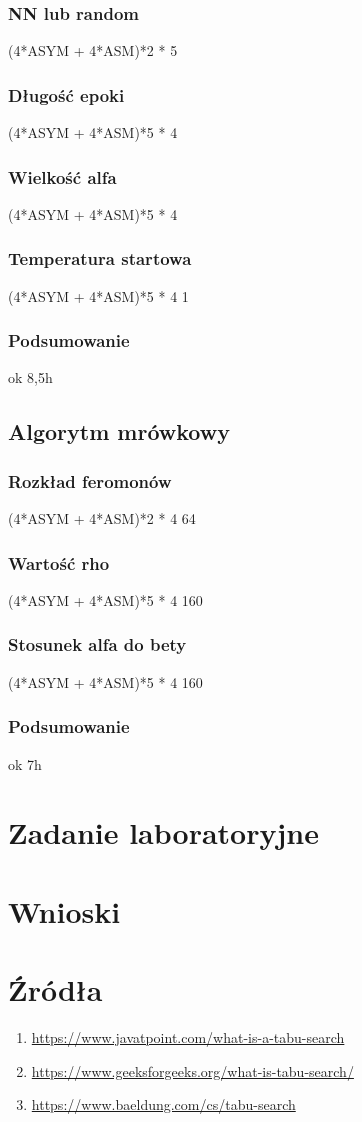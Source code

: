\documentclass{article}
\begin{document}
      \subsubsection{NN lub random}
        (4*ASYM + 4*ASM)*2 * 5 
      \subsubsection{Długość epoki}
        (4*ASYM + 4*ASM)*5 * 4 
      \subsubsection{Wielkość alfa}
        (4*ASYM + 4*ASM)*5 * 4 
      \subsubsection{Temperatura startowa}
        (4*ASYM + 4*ASM)*5 * 4 1
      \subsubsection{Podsumowanie}ok 8,5h
    \subsection{Algorytm mrówkowy}
      \subsubsection{Rozkład feromonów}
        (4*ASYM + 4*ASM)*2 * 4 64
      \subsubsection{Wartość rho}
        (4*ASYM + 4*ASM)*5 * 4 160
      \subsubsection{Stosunek alfa do bety}
        (4*ASYM + 4*ASM)*5 * 4 160
      \subsubsection{Podsumowanie}ok 7h
    \section{Zadanie laboratoryjne}


    \section{Wnioski}


    \section{Źródła}
      \begin{enumerate}[label=\arabic*.]
        \item \url{https://www.javatpoint.com/what-is-a-tabu-search}
        \item \url{https://www.geeksforgeeks.org/what-is-tabu-search/}
        \item \url{https://www.baeldung.com/cs/tabu-search}
      \end{enumerate}
\end{document}
